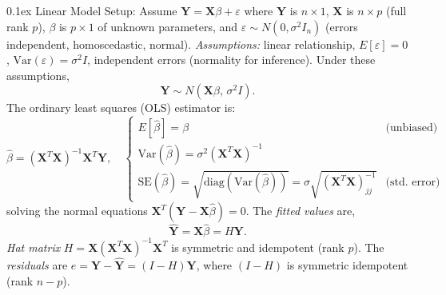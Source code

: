 \documentclass[10pt]{article}
\makeatletter
\renewcommand{\section}{\@startsection{section}{1}{0mm}
  {-0.1ex}%
  {0.1ex}%
  {\normalfont\normalsize\bfseries\color{thm-color}}}
\newcommand{\vect}[1]{\symbf{#1}} %
\makeatother
\begin{document}
\begin{multicols}{3}
  \section{Linear Model Setup:}
  Assume \( \vect{Y} = \vect{X}\beta + \varepsilon \) where \( \vect{Y} \) is \( n\times1 \), \( \vect{X} \) is \( n\times p \) (full rank \( p \)), \( \beta \) is \( p\times1 \) of unknown parameters, and \( \varepsilon \sim N(0,\sigma^2 I_n) \) (errors independent, homoscedastic, normal).
  \textit{Assumptions:} linear relationship, \( E[\varepsilon]=0 \), \( \mathrm{Var}(\varepsilon)=\sigma^2 I \), independent errors (normality for inference).
  Under these assumptions, \[ \vect{Y} \sim N(\vect{X}\beta,\,\sigma^2 I). \]
  The ordinary least squares (OLS) estimator is:
  \begin{equation*}
    \hat{\beta} = (\vect{X}^T \vect{X})^{-1} \vect{X}^T \vect{Y}, \quad
    \begin{cases}
      E[\hat{\beta}] = \beta                                                                                                    & \text{(unbiased)}   \\
      \mathrm{Var}(\hat{\beta}) = \sigma^2 (\vect{X}^T \vect{X})^{-1}                                                           &                     \\
      \mathrm{SE}(\hat{\beta}) = \sqrt{\mathrm{diag}(\mathrm{Var}(\hat{\beta}))}= \sigma \sqrt{(\vect{X}^T \vect{X})^{-1}_{jj}} & \text{(std. error)}
    \end{cases}
  \end{equation*}
  solving the normal equations \(\vect{X}^T(\vect{Y} - \vect{X}\hat{\beta})=0.\)
  The \textit{fitted values} are,
  \[\hat{\vect{Y}}=\vect{X}\hat{\beta}=H \vect{Y}.\]
  \textit{Hat matrix} \(H = \vect{X}(\vect{X}^T \vect{X})^{-1}\vect{X}^T\) is symmetric and idempotent (rank \( p \)).
  The \textit{residuals} are \( e = \vect{Y} - \hat{\vect{Y}} = (I - H)\vect{Y}\), where \((I-H)\) is symmetric idempotent (rank \( n-p \)).\\[0em]
\end{multicols}
\end{document}
